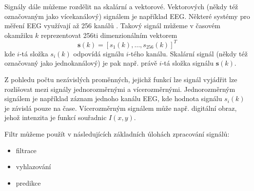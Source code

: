 \par
Signály dále můžeme rozdělit na skalární a vektorové. Vektorových (někdy též označovaným jako vícekanálový) signálem je například EEG. Některé systémy pro měření EEG využívají až 256 kanálů \cite{eeg}. Takový signál můžeme v časovém okamžiku $k$ reprezentovat 256ti dimenzionálním vektorem
\begin{equation}
    \textbf{s}(k)=[s_1(k),\dots,s_{256}(k)]^T
\end{equation}
kde $i$-tá složka $s_i(k)$ odpovídá signálu $i$-tého kanálu. Skalární signál (někdy též označovaný jako jednokanálový) je pak např. právě $i$-tá složka signálu $\textbf{s}(k)$.
\par 
Z pohledu počtu nezávislých proměnných, jejichž funkcí lze signál vyjádřit lze rozlišovat mezi signály jednorozměrnými a vícerozměrnými. Jednorozměrným signálem je například záznam jednoho kanálu EEG, kde hodnota signálu $s_i(k)$ je závislá pouze na čase. Vícerozměrným signálem může např. digitální obraz, jehož intenzita je funkcí souřadnic $I(x,y)$.

Filtr můžeme použít v  následujících základních úlohách zpracování signálů:
\begin{itemize}
    \item filtrace
    \item vyhlazování
    \item predikce
\end{itemize}


